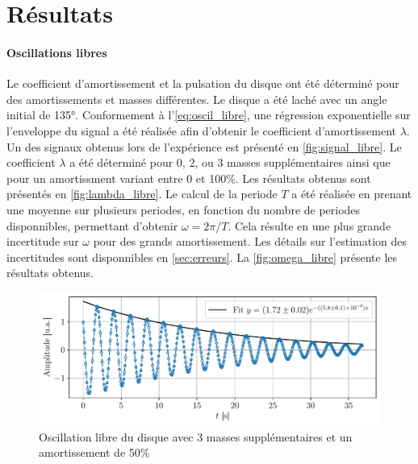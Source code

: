 \section{Résultats}

\paragraph{Oscillations libres}
Le coefficient d'amortissement et la pulsation du disque ont été déterminé pour des amortissements et masses différentes. Le disque a été laché avec un angle initial de 135°. Conformement à l'\autoref{eq:oscil_libre}, une régression exponentielle sur l'enveloppe du signal a été réalisée afin d'obtenir le coefficient d'amortissement \(\lambda\). Un des signaux obtenus lors de l'expérience est présenté en \autoref{fig:signal_libre}. Le coefficient \(\lambda\) a été déterminé pour 0, 2, ou 3 masses supplémentaires ainsi que pour un amortissment variant entre 0 et 100\%. Les résultats obtenus sont présentés en \autoref{fig:lambda_libre}. Le calcul de la periode \(T\) a été réalisée en prenant une moyenne sur plusieurs periodes, en fonction du nombre de periodes disponnibles, permettant d'obtenir \(\omega = 2 \pi / T\). Cela résulte en une plus grande incertitude sur \(\omega\) pour des grands amortissement. Les détails sur l'estimation des incertitudes sont disponnibles en \autoref{sec:erreurs}. La \autoref{fig:omega_libre} présente les résultats obtenus.

\begin{figure}[h]
    \centering
    \includegraphics[width=0.9\linewidth]{figures/I3_50_nomot_fitted.pdf}
    \caption{Oscillation libre du disque avec 3 masses supplémentaires et un amortissement de 50\%}
    \label{fig:signal_libre}
\end{figure}

